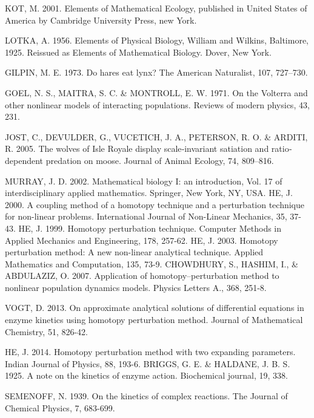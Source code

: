 \documentclass[a4paper,12pt]{article}
\begin{document}
\begin{thebibliography}{1} 

 KOT, M. 2001. Elements of Mathematical Ecology, published in United States of America by Cambridge University Press, new York.  


 LOTKA, A. 1956. Elements of Physical Biology, William and Wilkins, Baltimore, 1925. Reissued as Elements of Mathematical Biology. Dover, New York.

 GILPIN, M. E. 1973. Do hares eat lynx? The American Naturalist, 107, 727--730.  

 GOEL, N. S., MAITRA, S. C. \& MONTROLL, E. W. 1971. On the Volterra and other nonlinear models of interacting populations. Reviews of modern physics, 43, 231.

 JOST, C., DEVULDER, G., VUCETICH, J. A., PETERSON, R. O. \& ARDITI, R. 2005. The wolves of Isle Royale display scale‐invariant satiation and ratio‐dependent predation on moose. Journal of Animal Ecology, 74, 809--816.

 MURRAY, J. D. 2002. Mathematical biology I: an introduction, Vol. 17 of interdisciplinary applied mathematics. Springer, New York, NY, USA.
 HE, J. 2000. A coupling method of a homotopy technique and a perturbation technique for non-linear problems. International Journal of Non-Linear Mechanics, 35, 37-43.
 HE, J. 1999. Homotopy perturbation technique. Computer Methods in Applied Mechanics and Engineering, 178, 257-62.
 HE, J. 2003. Homotopy perturbation method: A new non-linear analytical technique. Applied Mathematics and Computation, 135, 73-9.
 CHOWDHURY, S., HASHIM, I., \& ABDULAZIZ, O. 2007. Application of homotopy--perturbation method to nonlinear population dynamics models. Physics Letters A., 368, 251-8.

 VOGT, D. 2013. On approximate analytical solutions of differential equations in enzyme kinetics using homotopy perturbation method. Journal of Mathematical Chemistry, 51, 826-42.

 HE, J. 2014. Homotopy perturbation method with two expanding parameters. Indian Journal of Physics, 88, 193-6. 
 BRIGGS, G. E. \& HALDANE, J. B. S. 1925. A note on the kinetics of enzyme action. Biochemical journal, 19, 338.

  SEMENOFF, N. 1939. On the kinetics of complex reactions. The Journal of Chemical Physics, 7, 683-699.


\end{thebibliography}
\end{document}
